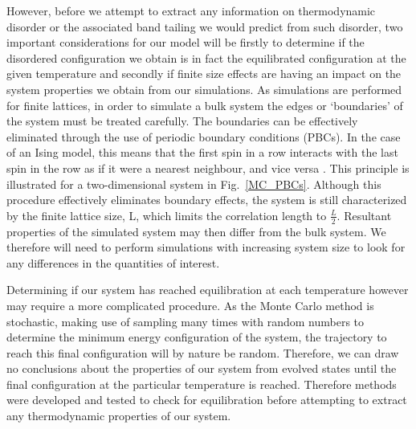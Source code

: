 \documentclass[11pt, twoside]{report}
\begin{document}
However, before we attempt to extract any information on thermodynamic disorder or the associated band tailing we would predict from such disorder, two important considerations for our model will be firstly to determine if the disordered configuration we obtain is in fact the equilibrated configuration at the given temperature and secondly if finite size effects are having an impact on the system properties we obtain from our simulations.
As simulations are performed for finite lattices, in order to simulate a bulk system the edges or `boundaries' of the system must be treated carefully. The boundaries can be effectively eliminated through the use of periodic boundary conditions (PBCs). In the case of an Ising model, this means that the first spin in a row interacts with the last spin in the row as if it were a nearest neighbour, and vice versa \cite{MC_Landau}. This principle is illustrated for a two-dimensional system in Fig.~\ref{MC_PBCs}. Although this procedure effectively eliminates boundary effects, the system is still characterized by the finite lattice size, L, which limits the correlation length to $\frac{L}{2}$. Resultant properties of the simulated system may then differ from the bulk system. We therefore will need to perform simulations with increasing system size to look for any differences in the quantities of interest.

Determining if our system has reached equilibration at each temperature however may require a more complicated procedure. As the Monte Carlo method is stochastic, making use of sampling many times with random numbers to determine the minimum energy configuration of the system, the trajectory to reach this final configuration will by nature be random. Therefore, we can draw no conclusions about the properties of our system from evolved states until the final configuration at the particular temperature is reached. Therefore methods were developed and tested to check for equilibration before attempting to extract any thermodynamic properties of our system.
\end{document}
